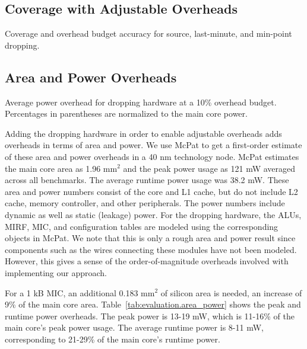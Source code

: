 \subsection{Coverage with Adjustable Overheads}
Coverage and overhead budget accuracy for source, last-minute, and min-point dropping.


\subsection{Area and Power Overheads}


\begin{table}[tb]
  \begin{center}
    \vspace{-0.0in}
    \begin{footnotesize}
    
    \end{footnotesize}
    \caption{Average power overhead for dropping hardware at a 10\% overhead
    budget. Percentages in parentheses are normalized to the main core
    power.}
    \vspace{-0.2in}
    \label{tab:evaluation.area_power}
  \end{center}
\end{table}

Adding the dropping hardware in order to enable adjustable overheads adds
overheads in terms of area and power. We use McPat \cite{mcpat-micro09} to get
a first-order estimate of these area and power overheads in a 40 nm technology
node. McPat estimates the main core area as 1.96 mm$^2$ and the peak power usage as
121 mW averaged across all benchmarks. The average runtime power usage was 38.2 
mW. These area and power numbers consist of the core and
L1 cache, but do not include L2 cache, memory controller, and other
peripherals. The power numbers include dynamic as well as static (leakage)
power. For the dropping hardware, the ALUs, MIRF, MIC, and
configuration tables are modeled using the corresponding objects in McPat. We
note that this is only a rough area and power result since components such as the
wires connecting these modules have not been modeled. However, this gives a
sense of the order-of-magnitude overheads involved with implementing our
approach.

For a 1 kB MIC, an additional 0.183 mm$^2$ of silicon area is needed, an
increase of 9\% of the main core area. Table~\ref{tab:evaluation.area_power}
shows the peak and runtime power overheads. The peak power is 13-19 mW, which is
11-16\% of the main core's peak power usage. The average runtime power is 8-11
mW, corresponding to 21-29\% of the main core's runtime power.

